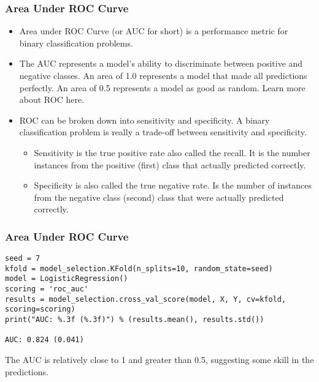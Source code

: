 \begin{frame}[fragile]\frametitle{Area Under ROC Curve}

	\begin{itemize}
	\item Area under ROC Curve (or AUC for short) is a performance metric for binary classification problems.
	\item The AUC represents a model’s ability to discriminate between positive and negative classes. An area of 1.0 represents a model that made all predictions perfectly. An area of 0.5 represents a model as good as random. Learn more about ROC here.
	\item ROC can be broken down into sensitivity and specificity. A binary classification problem is really a trade-off between sensitivity and specificity.
		\begin{itemize}

	\item Sensitivity is the true positive rate also called the recall. It is the number instances from the positive (first) class that actually predicted correctly.
	\item Specificity is also called the true negative rate. Is the number of instances from the negative class (second) class that were actually predicted correctly.
	\end{itemize}
	\end{itemize}

\end{frame}

\begin{frame}[fragile]\frametitle{Area Under ROC Curve}
\begin{lstlisting}
seed = 7
kfold = model_selection.KFold(n_splits=10, random_state=seed)
model = LogisticRegression()
scoring = 'roc_auc'
results = model_selection.cross_val_score(model, X, Y, cv=kfold, scoring=scoring)
print("AUC: %.3f (%.3f)") % (results.mean(), results.std())

AUC: 0.824 (0.041)
\end{lstlisting}

The AUC is relatively close to 1 and greater than 0.5, suggesting some skill in the predictions.
 \end{frame}



